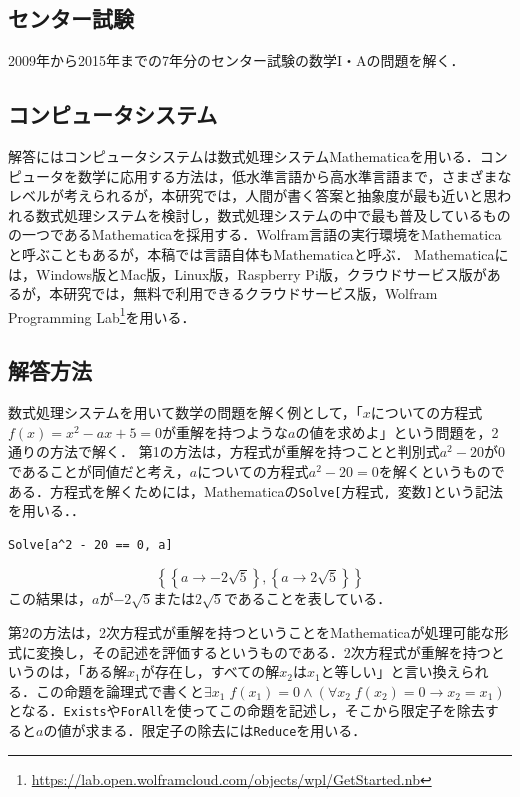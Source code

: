 \documentclass[uplatex,twocolumn]{jsarticle}
\begin{document}
\subsection{センター試験}
2009年から2015年までの7年分のセンター試験の数学I・Aの問題を解く．

\subsection{コンピュータシステム}
解答にはコンピュータシステムは数式処理システムMathematicaを用いる．コンピュータを数学に応用する方法は，低水準言語から高水準言語まで，さまざまなレベルが考えられるが，本研究では，人間が書く答案と抽象度が最も近いと思われる数式処理システムを検討し，数式処理システムの中で最も普及しているものの一つであるMathematicaを採用する．Wolfram言語の実行環境をMathematicaと呼ぶこともあるが，本稿では言語自体もMathematicaと呼ぶ．
Mathematicaには，Windows版とMac版，Linux版，Raspberry Pi版，クラウドサービス版があるが，本研究では，無料で利用できるクラウドサービス版，Wolfram Programming Lab\footnote{\url{https://lab.open.wolframcloud.com/objects/wpl/GetStarted.nb}}を用いる．

\subsection{解答方法}
数式処理システムを用いて数学の問題を解く例として，「$x$についての方程式$f(x)=x^2-ax+5=0$が重解を持つような$a$の値を求めよ」という問題を，2通りの方法で解く．
第1の方法は，方程式が重解を持つことと判別式$a^2-20$が$0$であることが同値だと考え，$a$についての方程式$a^2-20=0$を解くというものである．方程式を解くためには，Mathematicaの\verb|Solve[|方程式\verb|, |変数\verb|]|という記法を用いる．\cite{wolfram2014}．

\begin{verbatim}
Solve[a^2 - 20 == 0, a]
\end{verbatim}
\vspace{-5mm}\[\left\{\left\{a\to -2 \sqrt{5}\right\},\left\{a\to 2 \sqrt{5}\right\}\right\}\]
この結果は，$a$が$-2\sqrt{5}$または$2\sqrt{5}$であることを表している．

第2の方法は，2次方程式が重解を持つということをMathematicaが処理可能な形式に変換し，その記述を評価するというものである．2次方程式が重解を持つというのは，「ある解$x_1$が存在し，すべての解$x_2$は$x_1$と等しい」と言い換えられる．この命題を論理式で書くと$\exists x_1\;f(x_1)=0\land\left(\forall x_2\;f(x_2)=0\to x_2=x_1\right)$となる．\verb|Exists|や\verb|ForAll|を使ってこの命題を記述し，そこから限定子を除去すると$a$の値が求まる．限定子の除去には\verb|Reduce|を用いる．
\end{document}
